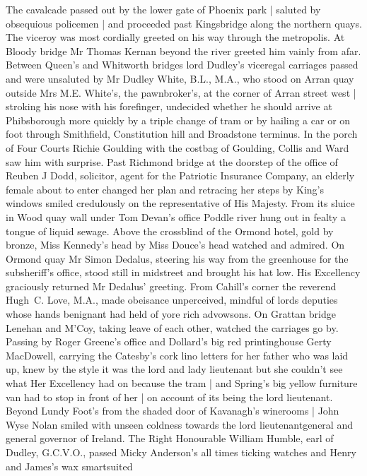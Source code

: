The cavalcade passed out by the lower gate of Phoenix park |
saluted by obsequious policemen |
and proceeded past Kingsbridge
along the northern quays.
The viceroy was most cordially greeted
on his way through the metropolis.
At Bloody bridge
Mr Thomas Kernan beyond the river
greeted him vainly from afar.
Between Queen's and Whitworth bridges
lord
Dudley's viceregal carriages passed
and were unsaluted by Mr Dudley White, B.L., M.A.,
who stood on Arran quay outside Mrs M.E. White's,
the pawnbroker's,
at the corner of Arran street west |
stroking his nose with his forefinger,
undecided whether he should arrive at Phibsborough
more quickly by a triple change of tram
or by hailing a car
or on foot
through Smithfield, Constitution hill and Broadstone terminus.
In the porch of Four Courts
Richie Goulding with the costbag of Goulding,
Collis and Ward
saw him with surprise.
Past Richmond bridge
at the
doorstep of the office of Reuben J Dodd, solicitor,
agent for the
Patriotic Insurance Company,
an elderly female about to enter
changed
her plan
and retracing her steps by King's windows
smiled credulously
on the representative of His Majesty.
From its sluice in Wood quay
wall
under Tom Devan's office
Poddle river hung out in fealty
a tongue
of liquid sewage.
Above the crossblind of the Ormond hotel,
gold by
bronze,
Miss Kennedy's head by Miss Douce's head
watched and admired.
On Ormond quay
Mr Simon Dedalus,
steering his way from the greenhouse for the subsheriff's office,
stood still in midstreet
and brought his hat low.
His Excellency graciously returned Mr Dedalus' greeting.
From Cahill's corner
the reverend Hugh~C. Love, M.A.,
made obeisance
unperceived,
mindful of lords deputies
whose hands benignant
had held of yore rich advowsons.
On Grattan bridge
Lenehan and M'Coy,
taking leave of each other,
watched the carriages go by.
Passing by Roger
Greene's office
and Dollard's big red printinghouse
Gerty MacDowell,
carrying the Catesby's cork lino letters
for her father who was laid up,
knew by the style
it was the lord and lady lieutenant
but she couldn't see
what Her Excellency had on
because the tram |
and Spring's big yellow furniture van
had to stop in front of her |
on account of its being the lord lieutenant.
Beyond Lundy Foot's
from the shaded door of Kavanagh's winerooms |
John Wyse Nolan smiled with unseen coldness
towards the lord
lieutenantgeneral and general governor of Ireland.
The Right Honourable
William Humble,
earl of Dudley,
G.C.V.O.,
passed Micky Anderson's
all times ticking watches
and Henry and James's wax smartsuited
